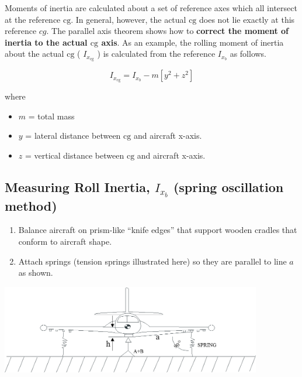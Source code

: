 \documentclass[
]{book}
\providecommand{\tightlist}{%
  \setlength{\itemsep}{0pt}\setlength{\parskip}{0pt}}
\begin{document}
Moments of inertia are calculated about a set of reference axes which all intersect at the reference \(\mathrm{cg}\). In general, however, the actual \(\mathrm{cg}\) does not lie exactly at this reference \(cg\). The parallel axis theorem shows how to \textbf{correct the moment of inertia to the actual \(\mathrm{cg}\) axis}. As an example, the rolling moment of inertia about the actual \(\mathrm{cg}\) ( \(I_{x_{\mathrm{cg}}}\) ) is calculated from the reference \(I_{x_b}\) as follows.

\[ I_{x_{\mathrm{cg}}} = I_{x_b} - m \left[ y^2 + z^2 \right] \]

where

\begin{itemize}
\tightlist
\item
  \(m\) = total mass
\item
  \(y\) = lateral distance between \(\mathrm{cg}\) and aircraft x-axis.
\item
  \(z\) = vertical distance between \(\mathrm{cg}\) and aircraft x-axis.
\end{itemize}

\hypertarget{measuring-roll-inertia-i_x_b-spring-oscillation-method}{%
\subsection{\texorpdfstring{Measuring Roll Inertia, \(I_{x_b}\) (spring oscillation method)}{Measuring Roll Inertia, I\_\{x\_b\} (spring oscillation method)}}\label{measuring-roll-inertia-i_x_b-spring-oscillation-method}}

\begin{enumerate}
\def\labelenumi{\arabic{enumi}.}
\tightlist
\item
  Balance aircraft on prism-like ``knife edges'' that support wooden cradles that conform to aircraft shape.
\item
  Attach springs (tension springs illustrated here) so they are parallel to line \(a\) as shown.
\end{enumerate}

\includegraphics[width=4.47917in,height=1.52847in]{media/07/image24.png}~
\end{document}
